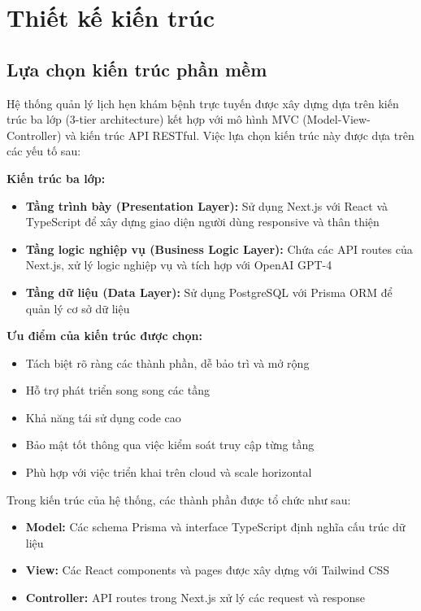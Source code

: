 \documentclass[../DoAn.tex]{subfiles}
\begin{document}
\section{Thiết kế kiến trúc}
\subsection{Lựa chọn kiến trúc phần mềm}

Hệ thống quản lý lịch hẹn khám bệnh trực tuyến được xây dựng dựa trên kiến trúc ba lớp (3-tier architecture) kết hợp với mô hình MVC (Model-View-Controller) và kiến trúc API RESTful. Việc lựa chọn kiến trúc này được dựa trên các yếu tố sau:

\textbf{Kiến trúc ba lớp:}
\begin{itemize}
    \item \textbf{Tầng trình bày (Presentation Layer):} Sử dụng Next.js với React và TypeScript để xây dựng giao diện người dùng responsive và thân thiện
    \item \textbf{Tầng logic nghiệp vụ (Business Logic Layer):} Chứa các API routes của Next.js, xử lý logic nghiệp vụ và tích hợp với OpenAI GPT-4
    \item \textbf{Tầng dữ liệu (Data Layer):} Sử dụng PostgreSQL với Prisma ORM để quản lý cơ sở dữ liệu
\end{itemize}

\textbf{Ưu điểm của kiến trúc được chọn:}
\begin{itemize}
    \item Tách biệt rõ ràng các thành phần, dễ bảo trì và mở rộng
    \item Hỗ trợ phát triển song song các tầng
    \item Khả năng tái sử dụng code cao
    \item Bảo mật tốt thông qua việc kiểm soát truy cập từng tầng
    \item Phù hợp với việc triển khai trên cloud và scale horizontal
\end{itemize}

Trong kiến trúc của hệ thống, các thành phần được tổ chức như sau:
\begin{itemize}
    \item \textbf{Model:} Các schema Prisma và interface TypeScript định nghĩa cấu trúc dữ liệu
    \item \textbf{View:} Các React components và pages được xây dựng với Tailwind CSS
    \item \textbf{Controller:} API routes trong Next.js xử lý các request và response
\end{itemize}
\end{document}

